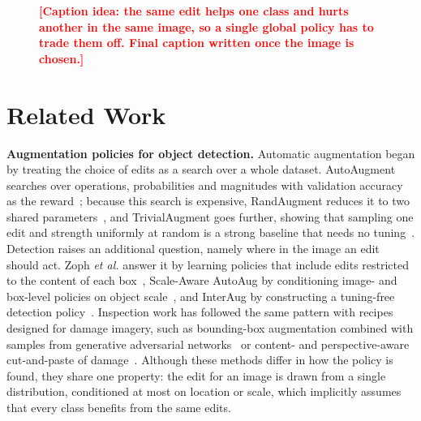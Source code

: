 \documentclass[conference]{IEEEtran}
\newcommand{\todo}[1]{\textcolor{red}{\textbf{[#1]}}}
\begin{document}
\begin{figure}[t]
\centering
{}
\caption[Teaser]{\todo{Caption idea: the same edit helps one class and hurts another in the same image, so a single global policy has to trade them off. Final caption written once the image is chosen.}}
\label{fig:teaser}
\end{figure}

\section{Related Work}
\label{sec:related}

\noindent\textbf{Augmentation policies for object detection.} Automatic augmentation began by treating the choice of edits as a search over a whole dataset. AutoAugment searches over operations, probabilities and magnitudes with validation accuracy as the reward~\cite{cubuk2019auto}; because this search is expensive, RandAugment reduces it to two shared parameters~\cite{cubuk2020rand}, and TrivialAugment goes further, showing that sampling one edit and strength uniformly at random is a strong baseline that needs no tuning~\cite{muller2021trivial}. Detection raises an additional question, namely where in the image an edit should act. Zoph \emph{et al.} answer it by learning policies that include edits restricted to the content of each box~\cite{zoph2020det}, Scale-Aware AutoAug by conditioning image- and box-level policies on object scale~\cite{chen2021scale}, and InterAug by constructing a tuning-free detection policy~\cite{thopalli2023interaug}. Inspection work has followed the same pattern with recipes designed for damage imagery, such as bounding-box augmentation combined with samples from generative adversarial networks~\cite{aghayan2024} or content- and perspective-aware cut-and-paste of damage~\cite{rdd_cutpaste}. Although these methods differ in how the policy is found, they share one property: the edit for an image is drawn from a single distribution, conditioned at most on location or scale, which implicitly assumes that every class benefits from the same edits.
\end{document}
